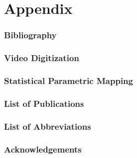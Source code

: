 \documentclass[12pt,a4paper,twoside]{report}
\newcommand\cleartorightpage{
\ifodd\value{page}\hbox{}\clearpage\else\hbox{}\cleardoublepage\fi
\hbox{}
}
\newcommand\chng[1]{#1}
\begin{document}
\cleartorightpage
\part{Appendix}\label{appendix}

\addtocounter{chapter}{+1}
\setcounter{section}{0}

 \singlespacing
 \section{Bibliography}
 \renewcommand{\bibname}{}
 \makeatletter
 \renewcommand{\chapter}{\@gobbletwo}
 \makeatother
 
 

\clearpage
\section{Video Digitization}\label{cpt:digitization}


\clearpage
\section{Statistical Parametric Mapping}\label{cpt:spm1d}


\clearpage
\section{\chng{List of Publications}}\label{cpt:publications}



\clearpage
\section{List of Abbreviations}\label{abbreviations}
\begin{spacing}{1.5}

\end{spacing}


\clearpage
\section{Acknowledgements}\label{acknowledgements}


\end{document}
